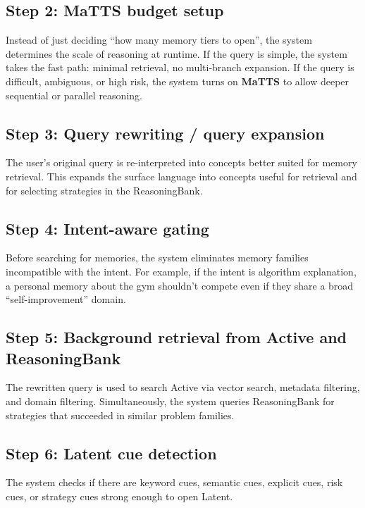 \documentclass[a4paper,12pt]{article}
\begin{document}
\subsection*{Step 2: MaTTS budget setup}

Instead of just deciding ``how many memory tiers to open'', the system determines the scale of reasoning at runtime. If the query is simple, the system takes the fast path: minimal retrieval, no multi-branch expansion. If the query is difficult, ambiguous, or high risk, the system turns on \textbf{MaTTS} to allow deeper sequential or parallel reasoning.

\subsection*{Step 3: Query rewriting / query expansion}

The user's original query is re-interpreted into concepts better suited for memory retrieval. This expands the surface language into concepts useful for retrieval and for selecting strategies in the ReasoningBank.

\subsection*{Step 4: Intent-aware gating}

Before searching for memories, the system eliminates memory families incompatible with the intent. For example, if the intent is algorithm explanation, a personal memory about the gym shouldn't compete even if they share a broad ``self-improvement'' domain.

\subsection*{Step 5: Background retrieval from Active and ReasoningBank}

The rewritten query is used to search Active via vector search, metadata filtering, and domain filtering. Simultaneously, the system queries ReasoningBank for strategies that succeeded in similar problem families.

\subsection*{Step 6: Latent cue detection}

The system checks if there are keyword cues, semantic cues, explicit cues, risk cues, or strategy cues strong enough to open Latent.
\end{document}
